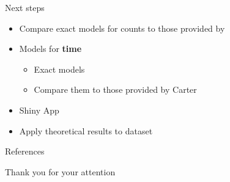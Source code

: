 \documentclass[english]{beamer}\usepackage[]{graphicx}\usepackage[]{xcolor}
\begin{document}
\begin{frame}{Next steps}
\begin{itemize}
\item Compare exact models for counts to those provided by \cite{carter2004application}
\item Models for \textbf{time} 
	\begin{itemize}
	\item Exact models
	\item Compare them to those provided by Carter
	\end{itemize}
\item Shiny App
\item Apply theoretical results to dataset
\end{itemize}

\end{frame}

\begin{frame}{References}
  \small
  

\end{frame}


\begin{frame}{Thank you for your attention}

\end{frame}


\end{document}
